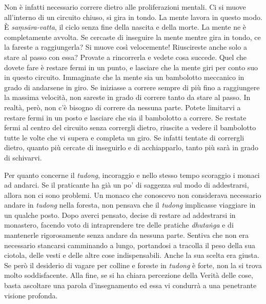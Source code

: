 Non è infatti necessario correre dietro alle proliferazioni mentali. Ci
si muove all'interno di un circuito chiuso, si gira in tondo. La mente
lavora in questo modo. È \emph{saṃsāra-vatta}, il ciclo senza fine della
nascita e della morte. La mente ne è completamente avvolta. Se cercaste
di inseguire la mente mentre gira in tondo, ce la fareste a
raggiungerla? Si muove così velocemente! Riuscireste anche solo a stare
al passo con essa? Provate a rincorrerla e vedete cosa succede. Quel che
dovete fare è restare fermi in un punto, e lasciare che la mente giri
per conto suo in questo circuito. Immaginate che la mente sia un
bambolotto meccanico in grado di andarsene in giro. Se iniziasse a
correre sempre di più fino a raggiungere la massima velocità, non
sareste in grado di correre tanto da stare al passo. In realtà, però,
non c'è bisogno di correre da nessuna parte. Potete limitarvi a restare
fermi in un posto e lasciare che sia il bambolotto a correre. Se restate
fermi al centro del circuito senza corrergli dietro, riuscite a vedere
il bambolotto tutte le volte che vi supera e completa un giro. Se
infatti tentate di corrergli dietro, quanto più cercate di inseguirlo e
di acchiapparlo, tanto più sarà in grado di schivarvi.

Per quanto concerne il \emph{tudong}, incoraggio e nello stesso tempo
scoraggio i monaci ad andarci. Se il praticante ha già un po' di
saggezza sul modo di addestrarsi, allora non ci sono problemi. Un monaco
che conoscevo non considerava necessario andare in \emph{tudong} nella
foresta, non pensava che il \emph{tudong} implicasse viaggiare in un
qualche posto. Dopo averci pensato, decise di restare ad addestrarsi in
monastero, facendo voto di intraprendere tre delle pratiche
\emph{dhutaṅga} e di mantenerle rigorosamente senza andare da nessuna
parte. Sentiva che non era necessario stancarsi camminando a lungo,
portandosi a tracolla il peso della sua ciotola, delle vesti e delle
altre cose indispensabili. Anche la sua scelta era giusta. Se però il
desiderio di vagare per colline e foreste in \emph{tudong} è forte, non
la si trova molto soddisfacente. Alla fine, se si ha chiara percezione
della Verità delle cose, basta ascoltare una parola d'insegnamento ed
essa vi condurrà a una penetrante visione profonda.

